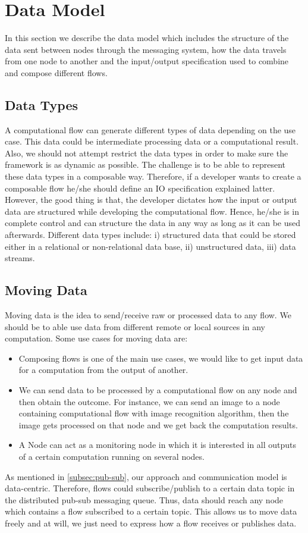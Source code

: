 \section{Data Model}
In this section we describe the data model which includes the structure of the data sent between nodes through the messaging system, how the data travels from one node to another and the input/output specification used to combine and compose different flows.

\subsection{Data Types}
A computational flow can generate different types of data depending on the use case. This data could be intermediate processing data or a computational result. Also, we should not attempt restrict the data types in order to make sure the framework is as dynamic as possible. The challenge is to be able to represent these data types in a composable way. Therefore, if a developer wants to create a composable flow he/she should define an IO specification explained latter. However, the good thing is that, the developer dictates how the input or output data are structured while developing the computational flow. Hence, he/she is in complete control and can structure the data in any way as long as it can be used afterwards.  Different data types include: i) structured data that could be stored either in a relational or non-relational data base, ii) unstructured data, iii)  data streams.

\subsection{Moving Data}

Moving data is the idea  to send/receive raw or processed data to any flow. We should be to able use data from different remote or local sources in any computation. Some use cases for moving data are:
\begin{itemize}
\item Composing flows is one of the main use cases, we would like to get input data for a computation from the output of another.

\item We can send data to be processed by a computational flow on any node and then obtain the outcome. For instance, we can send an image to a node containing computational flow with image recognition algorithm, then the image gets processed on that node and we get back the computation results. 

\item A Node can act as a monitoring node in which it is interested in all outputs of a certain computation running on several nodes.

\end{itemize} 
 As mentioned in \ref{subsec:pub-sub}, our approach and communication model is data-centric. Therefore, flows could subscribe/publish to a certain data topic in the distributed pub-sub messaging queue. Thus, data should reach any node which contains a flow subscribed to a certain topic. This allows us to move data freely and at will, we just need to express how a flow receives or publishes data.

